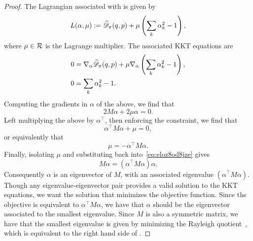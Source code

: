 \begin{proof}
The Lagrangian associated with  is given by
\begin{align*}
    L(\alpha,\mu) := \widehat{\mathscr{D}}_{\pi}(q, p) + \mu \left(\sum_k \alpha_k^2 -1\right),
\end{align*}
where $\mu \in \mathcal{R}$ is the Lagrange multiplier. The associated KKT equations
are
\begin{align}
    0 &= \nabla_{\alpha }\widehat{\mathscr{D}}_{\pi}(q, p) + \mu  \nabla_{\alpha }\left(\sum_k \alpha_k^2 -1\right), \\
   0 &= \sum_k \alpha_k^2 -1.
\end{align}
Computing the gradients in $\alpha$ of the above, we find that
\begin{equation}\label{eq:eloz8od8jze}
2 M \alpha + 2\mu \alpha =0.
    \end{equation}
Left multiplying the above by $\alpha^\top$, then enforcing the constraint, we find that
\[ \alpha^\top M \alpha +\mu  =0,\]
or equivalently that
\[\mu = -\alpha^\top M \alpha.\]
Finally, isolating $\mu$ and substituting back into~\eqref{eq:eloz8od8jze} gives
\[ M \alpha = (\alpha^\top M \alpha) \alpha. \]
Consequently $\alpha$ is an eigenvector of $M$, with an associated eigenvalue $(\alpha^\top M \alpha)$. Though any eigenvalue-eigenvector pair provides a valid solution to the KKT equations, we want the solution that minimizes the objective function.
Since ths objective is equivalent to $\alpha^\top M\alpha$,
we have that $\alpha$ should be the eigenvector associated to the smallest eigenvalue. Since $M$ is also a symmetric matrix, we have that
the smallest eigenvalue is given by minimizing the Rayleigh quotient~\citep{courant1924methoden},
which is equivalent to the right hand side of .
\fi
\end{proof}


%

